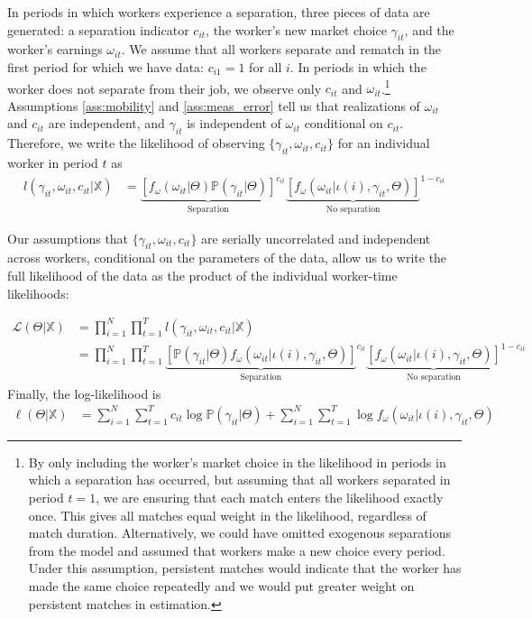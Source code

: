 \documentclass[12pt]{article}
\def\g{\gamma}
\def\i{\iota}
\renewcommand{\P}{\mathbb {P}}
\theoremstyle{definition}
\theoremstyle{plain}
\begin{document}
In periods in which workers experience a separation, three pieces of data are generated: a separation indicator $c_{it}$, the worker's new market choice $\g_{it}$, and the worker's earnings $\omega_{it}$. We assume that all workers separate and rematch in the first period for which we have data: $c_{i1}=1$ for all $i$. In periods in which the worker does not separate from their job, we observe only $c_{it}$ and  $\omega_{it}$.\footnote{By only including the worker's market choice in the likelihood in periods in which a separation has occurred, but assuming that all workers separated in period $t=1$, we are ensuring that each match enters the likelihood exactly once. This gives all matches equal weight in the likelihood, regardless of match duration. Alternatively, we could have omitted exogenous separations from the model and assumed that workers make a new choice every period. Under this assumption, persistent matches would indicate that the worker has made the same choice repeatedly and we would put greater weight on persistent matches in estimation.}  Assumptions \ref{ass:mobility} and \ref{ass:meas_error} tell us that realizations of $\omega_{it}$ and $c_{it}$ are independent, and $\g_{it}$ is independent of $\omega_{it}$ conditional on $c_{it}$. Therefore, we write the likelihood of observing $\{\g_{it},\omega_{it}, c_{it}\}$ for an individual worker in period $t$ as
\begin{align*}
	l(\g_{it},\omega_{it}, c_{it}|\mathbb{X}) &= \underset{\text{Separation}}{\underbrace{\left[ f_{\omega}(\omega_{it}|\Theta) \P(\g_{it}|\Theta) \right] }}^{c_{it}}\underset{\text{No separation}}{\underbrace{\left[ f_{\omega}(\omega_{it}|\i(i), \g_{it},\Theta)\right]}}^{1-c_{it}}
\end{align*}


Our assumptions that $\{\g_{it},\omega_{it}, c_{it}\}$ are serially uncorrelated and independent across workers, conditional on the parameters of the data, allow us to write the full likelihood of the data as the product of the individual worker-time likelihoods:

\begin{align}
	\mathcal{L}(\Theta | \mathbb{X}) 	&=  \prod_{i = 1}^N  \prod_{t=1}^{T} l(\g_{it},\omega_{it}, c_{it}|\mathbb{X}) \nonumber \\
	&= \prod_{i = 1}^N  \prod_{t=1}^{T} \underset{\text{Separation}}{\underbrace{\left[ \P(\g_{it}|\Theta)f_{\omega}(\omega_{it}|\i(i), \g_{it},\Theta) \right] }}^{c_{it}}\underset{\text{No separation}}{\underbrace{\left[ f_{\omega}(\omega_{it}|\i(i), \g_{it},\Theta)\right]}}^{1-c_{it}}  
\end{align}
Finally, the log-likelihood is
\begin{align}
	\ell(\Theta | \mathbb{X}) 	&=  \sum_{i=1}^{N}\sum_{t = 1}^T c_{it} \log \P(\g_{it}|\Theta) + \sum_{i=1}^{N}\sum_{t = 1}^T \log f_{\omega}(\omega_{it}|\i(i), \g_{it}, \Theta) \label{eq:log_likelihood}
\end{align}
\end{document}
